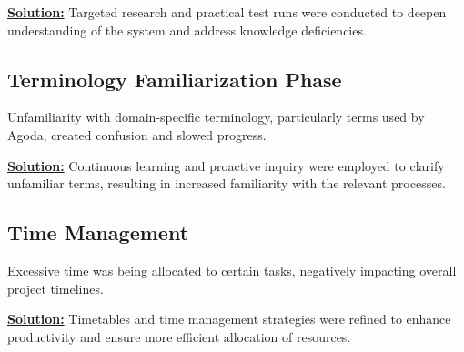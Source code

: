 \underline{\textbf{Solution:}} Targeted research and practical test runs were conducted to deepen understanding of the system and address knowledge deficiencies.

\subsection{Terminology Familiarization Phase} Unfamiliarity with domain-specific terminology, particularly terms used by Agoda, created confusion and slowed progress.

\underline{\textbf{Solution:}} Continuous learning and proactive inquiry were employed to clarify unfamiliar terms, resulting in increased familiarity with the relevant processes.

\subsection{Time Management} Excessive time was being allocated to certain tasks, negatively impacting overall project timelines.

\underline{\textbf{Solution:}} Timetables and time management strategies were refined to enhance productivity and ensure more efficient allocation of resources.



